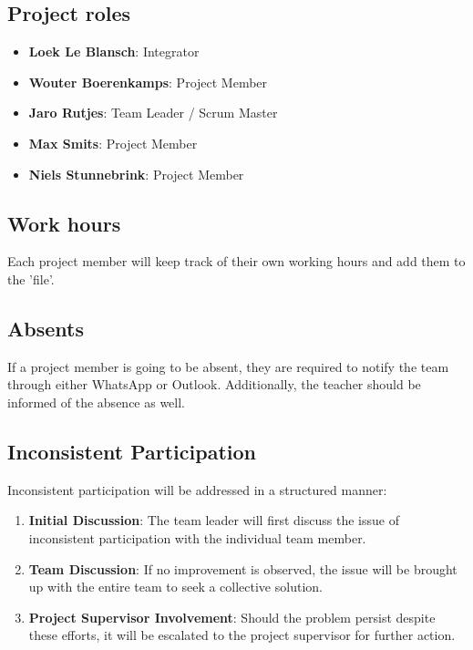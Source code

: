 \documentclass{projdoc}
\begin{document}
\subsection{Project roles}

\begin{itemize}
    \item \textbf{Loek Le Blansch}: Integrator
    \item \textbf{Wouter Boerenkamps}: Project Member
    \item \textbf{Jaro Rutjes}: Team Leader / Scrum Master
    \item \textbf{Max Smits}: Project Member
    \item \textbf{Niels Stunnebrink}: Project Member
\end{itemize}


\subsection{Work hours}
Each project member will keep track of their own working hours and 
add them to the 'file'.

\subsection{Absents}
If a project member is going to be absent, they are required to notify the 
team through either WhatsApp or Outlook. Additionally, the teacher should 
be informed of the absence as well.

\subsection{Inconsistent Participation}
Inconsistent participation will be addressed in a structured manner:

\begin{enumerate}
    \item \textbf{Initial Discussion}: The team leader will first discuss the 
    issue of inconsistent participation with the individual team member.
    \item \textbf{Team Discussion}: If no improvement is observed, the issue 
    will be brought up with the entire team to seek a collective solution.
    \item \textbf{Project Supervisor Involvement}: Should the problem persist 
    despite these efforts, it will be escalated to the project supervisor for 
    further action.
\end{enumerate}
\end{document}
